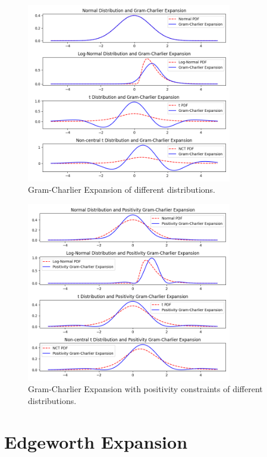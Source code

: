 \begin{figure}[h]
    \centering
    \includegraphics[width=0.8\textwidth]{img/gc_expansion.png}
    \caption{Gram-Charlier Expansion of different distributions.}
    \label{fig:gc_expansion}
\end{figure}

\begin{figure}[h]
    \centering
    \includegraphics[width=0.8\textwidth]{img/gc_positivity_expansion.png}
    \caption{Gram-Charlier Expansion with positivity constraints of different distributions.}
    \label{fig:gc_positivity_expansion}
\end{figure}

\section{Edgeworth Expansion}

